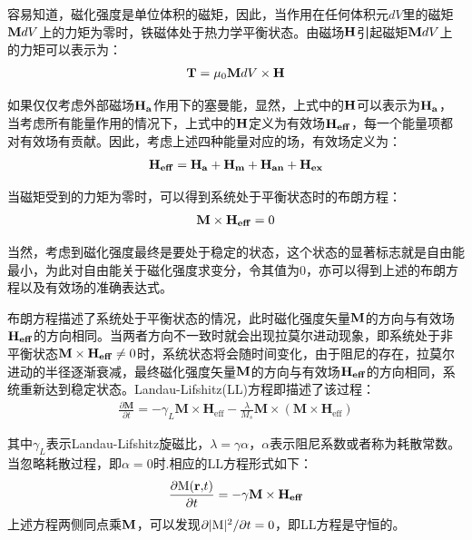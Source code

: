 	容易知道，磁化强度是单位体积的磁矩，因此，当作用在任何体积元$ dV $里的磁矩$ {\bf{M}}dV $上的力矩为零时，铁磁体处于热力学平衡状态。由磁场$ \bf{H} $引起磁矩$ {\bf{M}}dV $上的力矩可以表示为：
	\begin{align}
	{\bf{T}} = {\mu _0}{\bf{M}}dV \times {\bf{H}}
	\end{align}
	
	如果仅仅考虑外部磁场$ {{\bf{H}}_{\bf{a}}} $作用下的塞曼能，显然，上式中的$ {\bf{H}} $可以表示为$ {{\bf{H}}_{\bf{a}}} $，当考虑所有能量作用的情况下，上式中的$ {\bf{H}} $定义为有效场$ {{\bf{H}}_{{\bf{eff}}}} $，每一个能量项都对有效场有贡献。因此，考虑上述四种能量对应的场，有效场定义为：
	\begin{align}
	{{\bf{H}}_{{\bf{eff}}}} = {{\bf{H}}_{\bf{a}}} + {{\bf{H}}_{\bf{m}}} + {{\bf{H}}_{{\bf{an}}}} + {{\bf{H}}_{{\bf{ex}}}} \label{eq:1.4}
	\end{align}
	
	当磁矩受到的力矩为零时，可以得到系统处于平衡状态时的布朗方程：
	\begin{align}
	{\bf{M}} \times {{\bf{H}}_{{\bf{eff}}}} = 0  \label{eq:1.5}
	\end{align}
	
	当然，考虑到磁化强度最终是要处于稳定的状态，这个状态的显著标志就是自由能最小，为此对自由能关于磁化强度求变分，令其值为0，亦可以得到上述的布朗方程以及有效场的准确表达式。
	
	布朗方程描述了系统处于平衡状态的情况，此时磁化强度矢量$ {\bf{M}} $的方向与有效场$ {{\bf{H}}_{{\bf{eff}}}} $的方向相同。当两者方向不一致时就会出现拉莫尔进动现象，即系统处于非平衡状态$ {\bf{M}} \times {{\bf{H}}_{{\bf{eff}}}} \ne 0 $时，系统状态将会随时间变化，由于阻尼的存在，拉莫尔进动的半径逐渐衰减，最终磁化强度矢量$ {\bf{M}} $的方向与有效场$ {{\bf{H}}_{{\bf{eff}}}} $的方向相同，系统重新达到稳定状态。Landau-Lifshitz(LL)方程即描述了该过程：
	\begin{align}
	\frac{\partial \mathbf{M}}{\partial t}=-\gamma_L \mathbf{M} \times \mathbf{H}_{\mathrm{eff}}-\frac{\lambda}{M_{s}} \mathbf{M} \times\left(\mathbf{M} \times \mathbf{H}_{\mathrm{eff}}\right) \label{eq:1.7}
	\end{align}	
	
	其中$ \gamma_L $表示Landau-Lifshitz旋磁比，$ \lambda  = \gamma \alpha $，$ \alpha $表示阻尼系数或者称为耗散常数。
	当忽略耗散过程，即$ \alpha=0 $时.相应的LL方程形式如下：
	\begin{align}
	\frac{{\partial {\bf{{\rm {M}}(r,}}t{\bf{)}}}}{{\partial t}} =  - \gamma {\bf{M}} \times {{\bf{H}}_{{\bf{eff}}}}  \label{eq:1.6}
	\end{align}
	上述方程两侧同点乘$ \bf{M} $，可以发现$ \partial |{\bf{{\rm M}}}{|^2}/\partial t = 0 $，即LL方程是守恒的。
	
